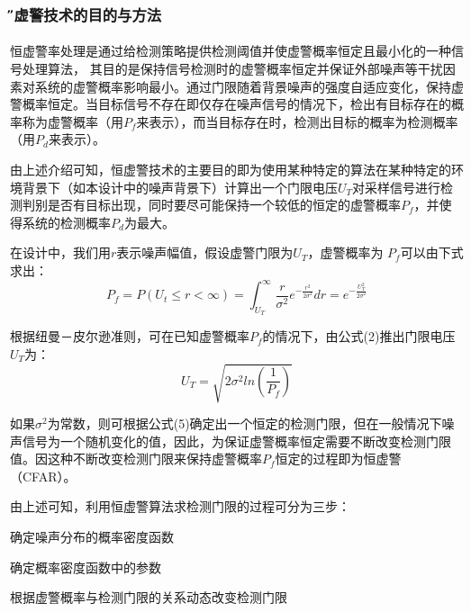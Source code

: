 \documentclass[12pt]{article} %
\begin{document}
 	\subsubsection{\H 恒虚警技术的目的与方法 } 
 	\paragraph{ \quad}  恒虚警率处理是通过给检测策略提供检测阈值并使虚警概率恒定且最小化的一种信号处理算法， 其目的是保持信号检测时的虚警概率恒定并保证外部噪声等干扰因素对系统的虚警概率影响最小。通过门限随着背景噪声的强度自适应变化，保持虚警概率恒定。当目标信号不存在即仅存在噪声信号的情况下，检出有目标存在的概率称为虚警概率（用$P_f$来表示），而当目标存在时，检测出目标的概率为检测概率（用$P_d$来表示）。
 	\par 由上述介绍可知，恒虚警技术的主要目的即为使用某种特定的算法在某种特定的环境背景下（如本设计中的噪声背景下）计算出一个门限电压$U_T$对采样信号进行检测判别是否有目标出现，同时要尽可能保持一个较低的恒定的虚警概率$P_f$，并使得系统的检测概率$P_d$为最大。

 	\par 在设计中，我们用$r$表示噪声幅值，假设虚警门限为$U_T$，虚警概率为 $P_f$可以由下式求出：
	\begin{equation}
	P_f =P (U_t \leq r < \infty) = \int_{ U_T }^{  \infty } {\frac{r}{\sigma^2}e^{-\frac{r^2}{2\sigma^2}}dr}  = e^{-\frac{U_T^2}{2\sigma^2}}
	\end{equation}
	
	
	根据纽曼－皮尔逊准则，可在已知虚警概率$P_f$的情况下，由公式(2)推出门限电压$U_T$为：
	\begin{equation}
	U_T=\sqrt{2\sigma^2ln(\frac{1}{P_f})}
	\end{equation}
	
	如果$\sigma^2$为常数，则可根据公式(5)确定出一个恒定的检测门限，但在一般情况下噪声信号为一个随机变化的值，因此，为保证虚警概率恒定需要不断改变检测门限值。因这种不断改变检测门限来保持虚警概率$P_f$恒定的过程即为恒虚警（CFAR）。
	\par 由上述可知，利用恒虚警算法求检测门限的过程可分为三步：
	\begin{compactitem} 
 			\item 确定噪声分布的概率密度函数
 			
			\item 确定概率密度函数中的参数

			\item 根据虚警概率与检测门限的关系动态改变检测门限


		 \end{compactitem}	
	
\end{document}

